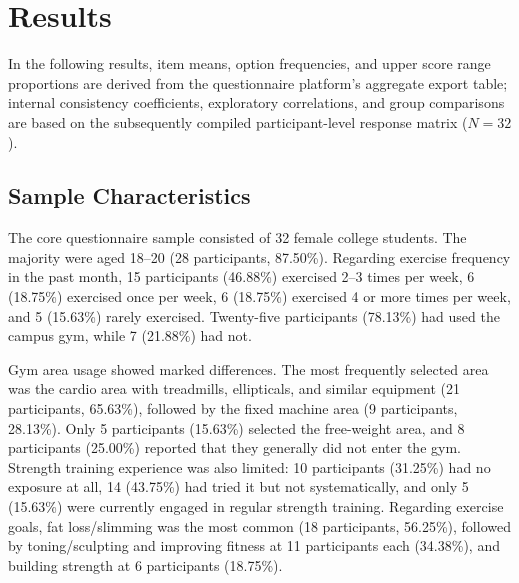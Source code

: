 \section{Results}

In the following results, item means, option frequencies, and upper score range proportions are derived from the questionnaire platform's aggregate export table; internal consistency coefficients, exploratory correlations, and group comparisons are based on the subsequently compiled participant-level response matrix ($N = 32$).

\subsection{Sample Characteristics}

The core questionnaire sample consisted of 32 female college students.
The majority were aged 18--20 (28 participants, 87.50\%).
Regarding exercise frequency in the past month, 15 participants (46.88\%) exercised 2--3 times per week, 6 (18.75\%) exercised once per week, 6 (18.75\%) exercised 4 or more times per week, and 5 (15.63\%) rarely exercised.
Twenty-five participants (78.13\%) had used the campus gym, while 7 (21.88\%) had not.

Gym area usage showed marked differences.
The most frequently selected area was the cardio area with treadmills, ellipticals, and similar equipment (21 participants, 65.63\%), followed by the fixed machine area (9 participants, 28.13\%).
Only 5 participants (15.63\%) selected the free-weight area, and 8 participants (25.00\%) reported that they generally did not enter the gym.
Strength training experience was also limited: 10 participants (31.25\%) had no exposure at all, 14 (43.75\%) had tried it but not systematically, and only 5 (15.63\%) were currently engaged in regular strength training.
Regarding exercise goals, fat loss/slimming was the most common (18 participants, 56.25\%), followed by toning/sculpting and improving fitness at 11 participants each (34.38\%), and building strength at 6 participants (18.75\%).

